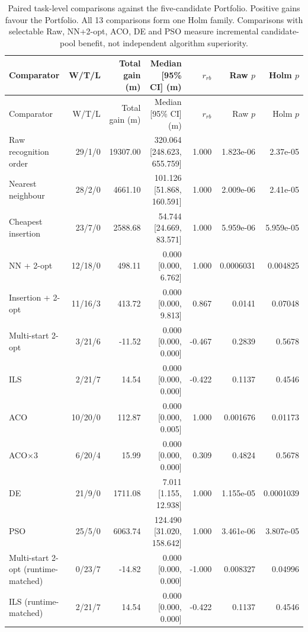 \begin{longtable}{lrrrrrr}
\caption{Paired task-level comparisons against the five-candidate Portfolio. Positive gains favour the Portfolio. All 13 comparisons form one Holm family. Comparisons with selectable Raw, NN+2-opt, ACO, DE and PSO measure incremental candidate-pool benefit, not independent algorithm superiority.}\label{tab:statistics}\\
\toprule
Comparator & W/T/L & Total gain (m) & Median [95\% CI] (m) & $r_{rb}$ & Raw $p$ & Holm $p$ \\
\midrule\endfirsthead
\toprule Comparator & W/T/L & Total gain (m) & Median [95\% CI] (m) & $r_{rb}$ & Raw $p$ & Holm $p$ \\
\midrule\endhead
Raw recognition order & 29/1/0 & 19307.00 & 320.064 [248.623, 655.759] & 1.000 & 1.823e-06 & 2.37e-05 \\
Nearest neighbour & 28/2/0 & 4661.10 & 101.126 [51.868, 160.591] & 1.000 & 2.009e-06 & 2.41e-05 \\
Cheapest insertion & 23/7/0 & 2588.68 & 54.744 [24.669, 83.571] & 1.000 & 5.959e-06 & 5.959e-05 \\
NN + 2-opt & 12/18/0 & 498.11 & 0.000 [0.000, 6.762] & 1.000 & 0.0006031 & 0.004825 \\
Insertion + 2-opt & 11/16/3 & 413.72 & 0.000 [0.000, 9.813] & 0.867 & 0.0141 & 0.07048 \\
Multi-start 2-opt & 3/21/6 & -11.52 & 0.000 [0.000, 0.000] & -0.467 & 0.2839 & 0.5678 \\
ILS & 2/21/7 & 14.54 & 0.000 [0.000, 0.000] & -0.422 & 0.1137 & 0.4546 \\
ACO & 10/20/0 & 112.87 & 0.000 [0.000, 0.005] & 1.000 & 0.001676 & 0.01173 \\
ACO$\times$3 & 6/20/4 & 15.99 & 0.000 [0.000, 0.000] & 0.309 & 0.4824 & 0.5678 \\
DE & 21/9/0 & 1711.08 & 7.011 [1.155, 12.938] & 1.000 & 1.155e-05 & 0.0001039 \\
PSO & 25/5/0 & 6063.74 & 124.490 [31.020, 158.642] & 1.000 & 3.461e-06 & 3.807e-05 \\
Multi-start 2-opt (runtime-matched) & 0/23/7 & -14.82 & 0.000 [0.000, 0.000] & -1.000 & 0.008327 & 0.04996 \\
ILS (runtime-matched) & 2/21/7 & 14.54 & 0.000 [0.000, 0.000] & -0.422 & 0.1137 & 0.4546 \\
\bottomrule
\end{longtable}
